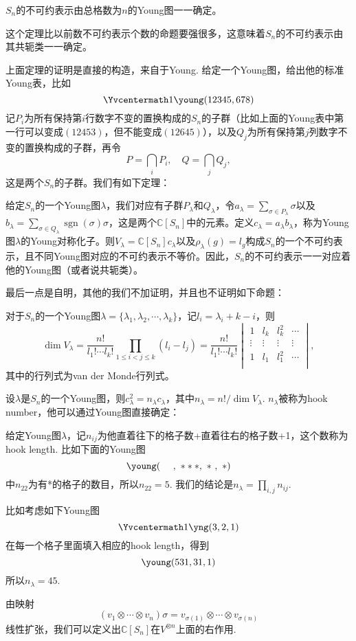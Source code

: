 \documentclass[9pt]{extarticle}
\newcommand{\cc}{\mathbb{C}}
\DeclareMathOperator{\sgn}{sgn}
\begin{document}
\theo $S_n$的不可约表示由总格数为$n$的Young图一一确定。

这个定理比以前数不可约表示个数的命题要强很多，这意味着$S_n$的不可约表示由其共轭类一一确定。

\para 上面定理的证明是直接的构造，来自于Young. 给定一个Young图，给出他的标准Young表，比如
\[\Yvcentermath1
	\young(12345,678)
\]
记$P_i$为所有保持第$i$行数字不变的置换构成的$S_n$的子群（比如上面的Young表中第一行可以变成$(12453)$，但不能变成$(12645)$），以及$Q_j$为所有保持第$j$列数字不变的置换构成的子群，再令
\[
	P=\bigcap_i P_i,\quad Q=\bigcap_j Q_j,
\]
这是两个$S_n$的子群。我们有如下定理：

\theo 给定$S_n$的一个Young图$\lambda$，我们对应有子群$P_\lambda$和$Q_\lambda$，令$a_\lambda=\sum_{\sigma\in P_\lambda}\sigma$以及$b_\lambda=\sum_{\sigma\in Q_\lambda}\sgn(\sigma)\sigma$，这是两个$\cc[S_n]$中的元素。定义$c_\lambda=a_\lambda b_\lambda$，称为Young图$\lambda$的Young对称化子。则$V_\lambda=\cc[S_n]c_\lambda$以及$\rho_\lambda(g)=l_g$构成$S_n$的一个不可约表示，且不同Young图对应的不可约表示不等价。因此，$S_n$的不可约表示一一对应着他的Young图（或者说共轭类）。

最后一点是自明，其他的我们不加证明，并且也不证明如下命题：

\pro 对于$S_n$的一个Young图$\lambda=\{\lambda_1,\lambda_2,\cdots,\lambda_k\}$，记$l_i=\lambda_i+k-i$，则
\[
	\dim V_\lambda=\frac{n!}{l_1!\cdots l_k!}\prod_{1\leq i< j\leq k}(l_i-l_j)=\frac{n!}{l_1!\cdots l_k!}\begin{vmatrix}
	1& l_k & l_k^2&\cdots\\
	\vdots&\vdots&\vdots&\vdots\\
	1& l_1 & l_1^2&\cdots\\
	\end{vmatrix},
\]
其中的行列式为van der Monde行列式。

\pro 设$\lambda$是$S_n$的一个Young图，则$c_\lambda^2=n_\lambda c_\lambda$，其中$n_\lambda=n!/\dim V_\lambda$. $n_\lambda$被称为hook number，他可以通过Young图直接确定：

给定Young图$\lambda$，记$n_{ij}$为他直着往下的格子数+直着往右的格子数+1，这个数称为hook length. 比如下面的Young图
\[
	\young(~~~~,~***,~*~,~*)
\]
中$n_{22}$为有*的格子的数目，所以$n_{22}=5$. 我们的结论是$n_\lambda=\prod_{i,j}n_{ij}$.

比如考虑如下Young图\[\Yvcentermath1
	\yng(3,2,1)
\]
在每一个格子里面填入相应的hook length，得到
\[
	\young(531,31,1)
\]
所以$n_\lambda= 45$.

\para 由映射
\[
	(v_{1}\otimes\cdots\otimes v_{n})\sigma=v_{{\sigma(1)}}\otimes\cdots\otimes v_{{\sigma(n)}}
\]
线性扩张，我们可以定义出$\cc[S_n]$在$V^{\otimes n}$上面的右作用.
\end{document}
